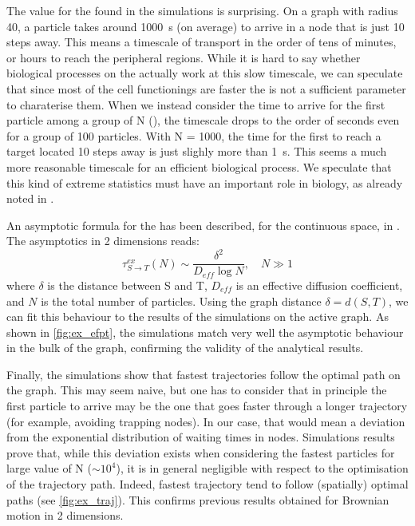 The value for the  found in the simulations is surprising. On a graph with radius 40, a particle takes around \SI{1000}{\second} (on average) to arrive in a node that is just 10 steps away. This means a timescale of transport in the order of tens of minutes, or hours to reach the peripheral regions. While it is hard to say whether biological processes on the  actually work at this slow timescale, we can speculate that since most of the cell functionings are faster the  is not a sufficient parameter to charaterise them. When we instead consider the time to arrive for the first particle among a group of N (), the timescale drops to the order of seconds even for a group of 100 particles. With N = 1000, the time for the first to reach a target located 10 steps away is just slighly more than \SI{1}{\second}. This seems a much more reasonable timescale for an efficient biological process. We speculate that this kind of extreme statistics must have an important role in biology, as already noted in .

An asymptotic formula for the  has been described, for the continuous space, in \cite[p.~330]{holcman2018asymptotics}. The asymptotics in 2 dimensions reads:
\begin{equation}
  \tau^{ex}_{S \to T}(N) \sim \frac{\delta^2}{D_{eff} \log N},\quad N \gg 1
\end{equation}
where $\delta$ is the distance between S and T, $D_{eff}$ is an effective diffusion coefficient, and $N$ is the total number of particles. Using the graph distance $\delta = d(S, T)$, we can fit this behaviour to the results of the simulations on the active graph. As shown in \cref{fig:ex_efpt}, the simulations match very well the asymptotic behaviour in the bulk of the graph, confirming the validity of the analytical results.

Finally, the simulations show that fastest trajectories follow the optimal path on the graph. This may seem naive, but one has to consider that in principle the first particle to arrive may be the one that goes faster through a longer trajectory (for example, avoiding trapping nodes). In our case, that would mean a deviation from the exponential distribution of waiting times in nodes. Simulations results prove that, while this deviation exists when considering the fastest particles for large value of N ($\sim 10^4$), it is in general negligible with respect to the optimisation of the trajectory path. Indeed, fastest trajectory tend to follow (spatially) optimal paths (see \cref{fig:ex_traj}). This confirms previous results obtained for Brownian motion in 2 dimensions.

